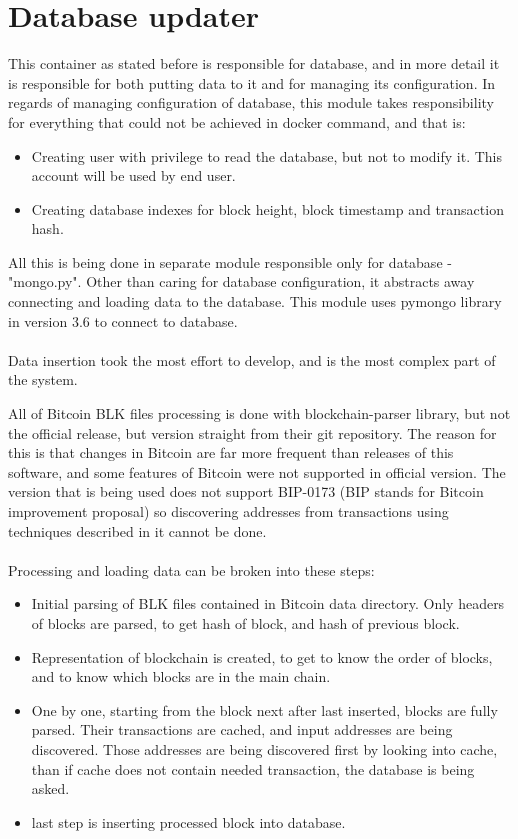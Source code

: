 \documentclass[12pt, en, eng, oneside, final]{mgr}
\begin{document}
\section{Database updater}
This container as stated before is responsible for database, and in more detail it is responsible for both putting data to it and for managing its configuration. In regards of managing configuration of database, this module takes responsibility for everything that could not be achieved in docker command, and that is:

\begin{itemize}
\item
Creating user with privilege to read the database, but not to modify it. This account will be used by end user.
\item
Creating database indexes for block height, block timestamp and transaction hash.
\end{itemize}

All this is being done in separate module responsible only for database - "mongo.py". Other than caring for database configuration, it abstracts away connecting and loading data to the database. This module uses pymongo\cite{pymongo} library in version 3.6 to connect to database.
\\
\\  
Data insertion took the most effort to develop, and is the most complex part of the system.

All of Bitcoin BLK files processing is done with blockchain-parser\cite{blockchain-parser} library, but not the official release, but version straight from their git repository\cite{blockchain-parser}. The reason for this is that changes in Bitcoin are far more frequent than releases of this software, and some features of Bitcoin were not supported in official version. The version that is being used does not support BIP-0173\cite{bip173} (BIP stands for Bitcoin improvement proposal) so discovering addresses from transactions using techniques described in it cannot be done. 
\\
\\
Processing and loading data can be broken into these steps:
\begin{itemize}
\item
Initial parsing of BLK files contained in Bitcoin data directory. Only headers of blocks are parsed, to get hash of block, and hash of previous block.
\item
Representation of blockchain is created, to get to know the order of blocks, and to know which blocks are in the main chain.
\item
One by one, starting from the block next after last inserted, blocks are fully parsed. Their transactions are cached, and input addresses are being discovered. Those addresses are being discovered first by looking into cache, than if cache does not contain needed transaction, the database is being asked.
\item
last step is inserting processed block into database.
\end{itemize}
\end{document}
